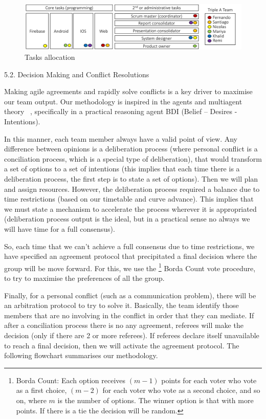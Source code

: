 \begin{figure}[ht]
\centering
\includegraphics[width=1\textwidth]{figs/tasks}
	\caption{Tasks allocation}
	\label{fig:Tasks}
\end{figure}



5.2. Decision Making and Conflict Resolutions

Making agile agreements and rapidly solve conflicts is a key driver to maximise our team output. Our methodology is inspired in the agents and multiagent theory ~\cite{4646etyet}, specifically in a practical reasoning agent BDI (Belief – Desires - Intentions).

In this manner, each team member always have a valid point of view. Any difference between opinions is a deliberation process (where personal conflict is a conciliation process, which is a special type of deliberation), that would transform a set of options to a set of intentions (this implies that each time there is a deliberation process, the first step is to state a set of options). Then we will plan and assign resources. However, the deliberation process required a balance due to time restrictions (based on our timetable and curve advance). This implies that we must state a mechanism to accelerate the process wherever it is appropriated (deliberation process output is the ideal, but in a practical sense no always we will have time for a full consensus).

So, each time that we can't achieve a full consensus due to time restrictions, we have specified an agreement protocol that precipitated a final decision where the group will be move forward. For this, we use the \footnote{Borda Count: Each option receives $(m-1)$ points for each voter who vote as a first choice, $(m-2)$ for each voter who vote as a second choice, and so on, where $m$ is the number of options.  The winner option is that with more points. If there is a tie the decision will be random.} Borda Count vote procedure, to try to maximise the preferences of all the group.

Finally, for a personal conflict (such as a communication problem), there will be an arbitration protocol to try to solve it. Basically, the team identify those members that are no involving in the conflict in order that they can mediate. If after a conciliation process there is no any agreement, referees will make the decision (only if there are 2 or more referees). If referees declare itself unavailable to reach a final decision, then we will activate the agreement protocol. The following flowchart summarises our methodology.

